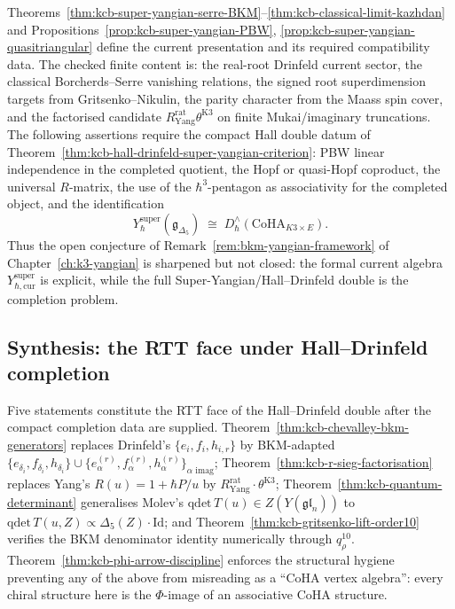 \begin{remark}
\label{rem:kcb-super-yangian-closure}
Theorems~\ref{thm:kcb-super-yangian-serre-BKM}--\ref{thm:kcb-classical-limit-kazhdan}
and Propositions~\ref{prop:kcb-super-yangian-PBW},
\ref{prop:kcb-super-yangian-quasitriangular} define the current
presentation and its required compatibility data. The checked finite
content is: the real-root Drinfeld current sector, the classical
Borcherds--Serre vanishing relations, the signed root superdimension
targets from Gritsenko--Nikulin, the parity character from the Maass spin
cover, and the factorised candidate
\(R^{\mathrm{rat}}_{\mathrm{Yang}}\theta^{\mathrm{K3}}\) on finite
Mukai/imaginary truncations. The following assertions require
the compact Hall double datum of
Theorem~\ref{thm:kcb-hall-drinfeld-super-yangian-criterion}: PBW
linear independence in the completed quotient, the Hopf or quasi-Hopf
coproduct, the universal \(R\)-matrix, the use of the
\(\hbar^3\)-pentagon as associativity for the completed object, and the
identification
\[
 Y_\hbar^{\mathrm{super}}(\mathfrak{g}_{\Delta_5})
 \;\cong\;
 D^\wedge_\hbar(\mathrm{CoHA}_{K3\times E}).
\]
Thus the open conjecture of Remark~\ref{rem:bkm-yangian-framework} of
Chapter~\ref{ch:k3-yangian} is sharpened but not closed: the formal
current algebra \(Y_{\hbar,\mathrm{cur}}^{\mathrm{super}}\) is explicit,
while the full Super-Yangian/Hall--Drinfeld double is the completion
problem.
\end{remark}

\subsection{Synthesis: the RTT face under Hall--Drinfeld completion}
\label{subsec:kcb-rtt-summary}

Five statements constitute the RTT face of the Hall--Drinfeld double
after the compact completion data are supplied.
Theorem~\ref{thm:kcb-chevalley-bkm-generators} replaces Drinfeld's
$\{e_i, f_i, h_{i,r}\}$ by BKM-adapted
$\{e_{\delta_i}, f_{\delta_i}, h_{\delta_i}\}\cup\{e^{(r)}_{\alpha},
f^{(r)}_{\alpha}, h^{(r)}_{\alpha}\}_{\alpha\text{ imag}}$;
Theorem~\ref{thm:kcb-r-sieg-factorisation} replaces Yang's $R(u)=1+\hbar P/u$ by
$R^{\mathrm{rat}}_{\mathrm{Yang}}\cdot\theta^{\mathrm{K3}}$;
Theorem~\ref{thm:kcb-quantum-determinant} generalises Molev's
$\mathrm{qdet}\,T(u) \in Z(Y(\mathfrak{gl}_n))$ to
$\mathrm{qdet}\,T(u,Z) \propto \Delta_5(Z)\cdot\mathrm{Id}$; and
Theorem~\ref{thm:kcb-gritsenko-lift-order10} verifies the BKM denominator
identity numerically through $q_\rho^{10}$.
Theorem~\ref{thm:kcb-phi-arrow-discipline} enforces the structural hygiene
preventing any of the above from misreading as a ``CoHA vertex algebra'':
every chiral structure here is the $\Phi$-image of an associative CoHA structure.


